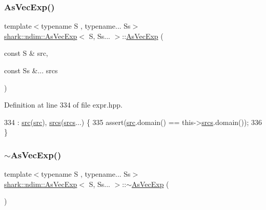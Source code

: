 \subsubsection{\texorpdfstring{As\+Vec\+Exp()}{AsVecExp()}}
{\footnotesize\ttfamily template$<$typename S , typename... Ss$>$ \\
\hyperlink{classshark_1_1ndim_1_1_as_vec_exp}{shark\+::ndim\+::\+As\+Vec\+Exp}$<$ S, Ss... $>$\+::\hyperlink{classshark_1_1ndim_1_1_as_vec_exp}{As\+Vec\+Exp} (\begin{DoxyParamCaption}\item[{const S \&}]{src,  }\item[{const Ss \&...}]{srcs }\end{DoxyParamCaption})}



Definition at line 334 of file expr.\+hpp.


\begin{DoxyCode}
334                                                                   : \hyperlink{classshark_1_1ndim_1_1_as_vec_exp_3_01_s_00_01_ss_8_8_8_01_4_a194abf424b594c3e86a42aa114700e51}{src}(\hyperlink{classshark_1_1ndim_1_1_as_vec_exp_3_01_s_00_01_ss_8_8_8_01_4_a194abf424b594c3e86a42aa114700e51}{src}), 
      \hyperlink{classshark_1_1ndim_1_1_as_vec_exp_3_01_s_00_01_ss_8_8_8_01_4_aed5717d0b843d3fbe4c99a13109fbb6b}{srcs}(\hyperlink{classshark_1_1ndim_1_1_as_vec_exp_3_01_s_00_01_ss_8_8_8_01_4_aed5717d0b843d3fbe4c99a13109fbb6b}{srcs}...) \{
335             assert(\hyperlink{classshark_1_1ndim_1_1_as_vec_exp_3_01_s_00_01_ss_8_8_8_01_4_a194abf424b594c3e86a42aa114700e51}{src}.domain() == this->\hyperlink{classshark_1_1ndim_1_1_as_vec_exp_3_01_s_00_01_ss_8_8_8_01_4_aed5717d0b843d3fbe4c99a13109fbb6b}{srcs}.domain());
336         \}
\end{DoxyCode}
\hypertarget{classshark_1_1ndim_1_1_as_vec_exp_3_01_s_00_01_ss_8_8_8_01_4_a5f331adebca4ac26cd57deb7a90590fe}{}\label{classshark_1_1ndim_1_1_as_vec_exp_3_01_s_00_01_ss_8_8_8_01_4_a5f331adebca4ac26cd57deb7a90590fe} 
\subsubsection{\texorpdfstring{$\sim$\+As\+Vec\+Exp()}{~AsVecExp()}}
{\footnotesize\ttfamily template$<$typename S , typename... Ss$>$ \\
\hyperlink{classshark_1_1ndim_1_1_as_vec_exp}{shark\+::ndim\+::\+As\+Vec\+Exp}$<$ S, Ss... $>$\+::$\sim$\hyperlink{classshark_1_1ndim_1_1_as_vec_exp}{As\+Vec\+Exp} (\begin{DoxyParamCaption}{ }\end{DoxyParamCaption})}




